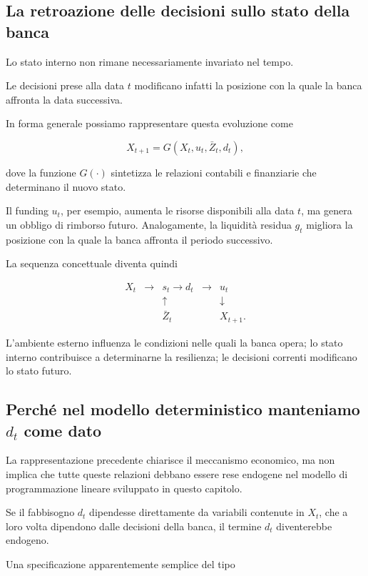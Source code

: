 \subsection{La retroazione delle decisioni sullo stato della banca}

Lo stato interno non rimane necessariamente invariato nel tempo.

Le decisioni prese alla data $t$ modificano infatti la posizione con la quale
la banca affronta la data successiva.

In forma generale possiamo rappresentare questa evoluzione come

\[
X_{t+1}
=
G(X_t,u_t,\bar Z_t,d_t),
\]

dove la funzione $G(\cdot)$ sintetizza le relazioni contabili e finanziarie
che determinano il nuovo stato.

Il funding $u_t$, per esempio, aumenta le risorse disponibili alla data $t$,
ma genera un obbligo di rimborso futuro. Analogamente, la liquidit\`a
residua $g_t$ migliora la posizione con la quale la banca affronta il periodo
successivo.

La sequenza concettuale diventa quindi

\[
\boxed{
\begin{array}{ccccc}
X_t
&
\longrightarrow
&
s_t\rightarrow d_t
&
\longrightarrow
&
u_t
\\[3pt]
&&
\uparrow
&&
\downarrow
\\[-2pt]
&&
\bar Z_t
&&
X_{t+1}.
\end{array}
}
\]

L'ambiente esterno influenza le condizioni nelle quali la banca opera; lo
stato interno contribuisce a determinarne la resilienza; le decisioni
correnti modificano lo stato futuro.

\subsection{Perch\'e nel modello deterministico manteniamo $d_t$ come dato}

La rappresentazione precedente chiarisce il meccanismo economico, ma non
implica che tutte queste relazioni debbano essere rese endogene nel modello
di programmazione lineare sviluppato in questo capitolo.

Se il fabbisogno $d_t$ dipendesse direttamente da variabili contenute in
$X_t$, che a loro volta dipendono dalle decisioni della banca, il termine
$d_t$ diventerebbe endogeno.

Una specificazione apparentemente semplice del tipo

